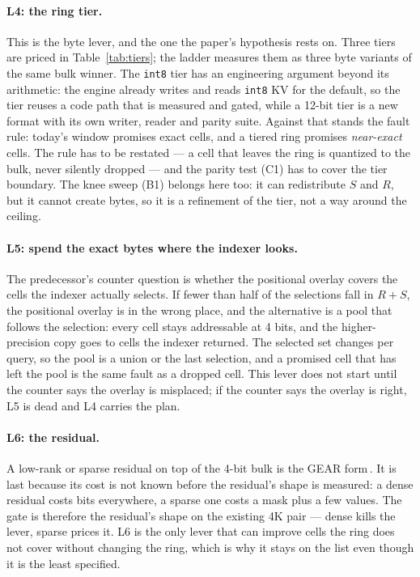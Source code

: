 \documentclass[10pt,twocolumn]{article}
\begin{document}
\paragraph{L4: the ring tier.} This is the byte lever, and the one the paper's hypothesis rests on. Three tiers are priced in Table~\ref{tab:tiers}; the ladder measures them as three byte variants of the same bulk winner. The \texttt{int8} tier has an engineering argument beyond its arithmetic: the engine already writes and reads \texttt{int8} KV for the default, so the tier reuses a code path that is measured and gated, while a 12-bit tier is a new format with its own writer, reader and parity suite. Against that stands the fault rule: today's window promises exact cells, and a tiered ring promises \emph{near-exact} cells. The rule has to be restated --- a cell that leaves the ring is quantized to the bulk, never silently dropped --- and the parity test (C1) has to cover the tier boundary. The knee sweep (B1) belongs here too: it can redistribute $S$ and $R$, but it cannot create bytes, so it is a refinement of the tier, not a way around the ceiling.

\paragraph{L5: spend the exact bytes where the indexer looks.} The predecessor's counter question is whether the positional overlay covers the cells the indexer actually selects. If fewer than half of the selections fall in $R{+}S$, the positional overlay is in the wrong place, and the alternative is a pool that follows the selection: every cell stays addressable at 4 bits, and the higher-precision copy goes to cells the indexer returned. The selected set changes per query, so the pool is a union or the last selection, and a promised cell that has left the pool is the same fault as a dropped cell. This lever does not start until the counter says the overlay is misplaced; if the counter says the overlay is right, L5 is dead and L4 carries the plan.

\paragraph{L6: the residual.} A low-rank or sparse residual on top of the 4-bit bulk is the GEAR form\,\cite{gear}. It is last because its cost is not known before the residual's shape is measured: a dense residual costs bits everywhere, a sparse one costs a mask plus a few values. The gate is therefore the residual's shape on the existing 4K pair --- dense kills the lever, sparse prices it. L6 is the only lever that can improve cells the ring does not cover without changing the ring, which is why it stays on the list even though it is the least specified.
\end{document}
